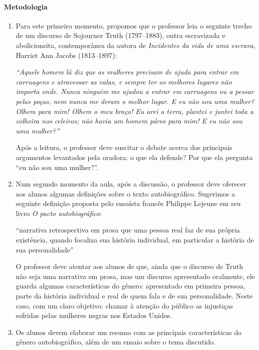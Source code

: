 \documentclass[11pt]{extarticle}
\begin{document}
\paragraph{Metodologia}

   \begin{enumerate}
    \item 
    Para este primeiro momento, propomos que o professor leia o seguinte trecho
    de um discurso de Sojourner Truth (1797--1883), outra escravizada e abolicionsita, contemporânea
    da autora de \textit{Incidentes da vida de uma escrava}, Harriet Ann Jacobs (1813--1897):

    \textit{``Aquele homem lá diz que as mulheres precisam de ajuda para entrar em carruagens
    e atravessar as valas, e sempre ter os melhores lugares não importa onde. Nunca ninguém
    me ajudou a entrar em carruagens ou a pessar pelas poças, nem nunca me deram o melhor
    lugar. E eu não sou uma mulher? Olhem para mim! Olhem o meu braço! Eu arei a terra, 
    plantei e juntei toda a colheira nos celeiros; não havia um homem páreo para mim! 
    E eu não sou uma mulher?''}

    Após a leitura, o professor deve suscitar o debate acerca dos principais argumentos 
    levantados pela oradora: o que ela defende? Por que ela pergunta ``eu não sou uma mulher?''.




    \item
    Num segundo momento da aula, após a discussão, o professor deve oferecer aos alunos algumas 
    definições sobre o texto autobiográfico. Sugerimos a seguinte definição
    proposta pelo ensaísta francês Philippe Lejeune em seu livro \emph{O pacto autobiográfico}:

    ``narrativa retrospectiva em prosa que uma pessoa real faz de sua própria existência, 
    quando focaliza sua história individual, em particular a história de sua personalidade'' 

    O professor deve atentar aos alunos de que, ainda que o discurso de Truth não seja uma 
    narrativa em prosa, mas um discurso apresentado oralmente, ele guarda algumas características
    do gênero: apresentado em primeira pessoa, parte da história individual e real de quem fala
    e de sua personalidade. Neste caso, com um claro objetivo: chamar à atenção do público
    as injustiças sofridas pelas mulheres negras nos Estados Unidos.

    \item
    Os alunos devem elaborar um resumo com as principais características do gênero autobiográfico,
    além de um ensaio sobre o tema discutido.


   \end{enumerate}
\end{document}
